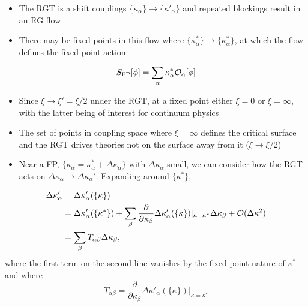 \begin{itemize}
    \item The RGT is a shift couplings $\{\kappa_\alpha\} \to \{ \kappa'_\alpha \}$ and repeated blockings result in an RG flow
    \item There may be fixed points in this flow where $\{ \kappa_\alpha^*\} \to \{ \kappa_\alpha^*\}$, at which the flow defines the fixed point action
\end{itemize}
\begin{equation}
    S_\text{FP}[\phi] = \sum_\alpha \kappa_\alpha^* \mathcal{O}_\alpha[\phi]
\end{equation}
\begin{itemize}
    \item Since $\xi \to \xi' = \xi/2$ under the RGT, at a fixed point either $\xi = 0$ or $\xi = \infty$, with the latter being of interest for continuum physics
    \item The set of points in coupling space where $\xi = \infty$ defines the critical surface and the RGT drives theories not on the surface away from it ($\xi \to \xi/2$)
    \item Near a FP, $\{ \kappa_\alpha = \kappa_\alpha^* + \Delta \kappa_\alpha\}$ with $\Delta\kappa_\alpha$ small, we can consider how the RGT acts on $\Delta \kappa_\alpha \to \Delta \kappa_\alpha'$. Expanding around $\{\kappa^*\}$,
\end{itemize}
\begin{align}
    \Delta \kappa_\alpha' &= \Delta \kappa_\alpha'(\{\kappa\}) \\ &= \Delta \kappa'_\alpha(\{\kappa^*\}) + \sum_\beta \frac{\partial}{\partial \kappa_\beta}\Delta \kappa_\alpha'(\{\kappa\})|_{\kappa = \kappa^*}\Delta\kappa_\beta + \mathcal{O}(\Delta \kappa^2) \\
    &= \sum_\beta T_{\alpha \beta}\Delta \kappa_\beta,
\end{align}
where the first term on the second line vanishes by the fixed point nature of $\kappa^*$ and where
\begin{equation}
    T_{\alpha \beta} = \frac{\partial}{\partial \kappa_\beta}\Delta \kappa'_\alpha(\{\kappa\})|_{\kappa = \kappa^*}
\end{equation}

